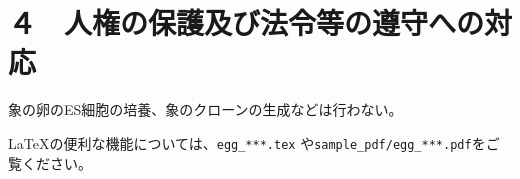 \documentclass[11pt,a4j,dvipdfmx]{jarticle} 					%
\newcommand{\研究課題名}{象の卵}
\newcommand{\研究機関名}{逢坂大学}
\newcommand{\研究代表者氏名}{湯川秀樹}
\newcommand{\研究期間の最終元号年度}{34}  %
\begin{document}



\section{４　人権の保護及び法令等の遵守への対応}

	象の卵のES細胞の培養、象のクローンの生成などは行わない。

	\LaTeX の便利な機能については、\texttt{egg\_***.tex} や\texttt{sample\_pdf/egg\_***.pdf}をご覧ください。



\end{document}
